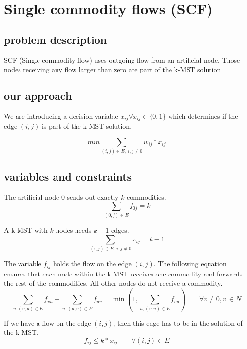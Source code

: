 \section{Single commodity flows (SCF)}

\subsection{problem description}
SCF (Single commodity flow) uses outgoing flow from an artificial node. Those nodes receiving any flow larger than zero are part of the k-MST solution

\subsection{our approach}
We are introducing a decision variable $x_{ij} \forall x_{ij} \in \{0,1\}$ which determines if the edge $(i,j)$ is part of the k-MST solution.

\begin{equation}
  min \sum_{(i,j) \in E, \ i,j \not =  0} w_{ij} * x_{ij} 
\end{equation}

\subsection{variables and constraints}

The artificial node $0$ sends out exactly $k$ commodities.
\begin{equation}
  \sum_{(0,j) \in E} f_{0j} = k 
\end{equation}

A k-MST with $k$ nodes needs $k-1$ edges.
\begin{equation}
  \sum_{(i,j) \in E, \ i,j \not =  0} x_{ij} = k-1 
\end{equation}

The variable $f_{ij}$ holds the flow on the edge $(i,j)$. 
The following equation ensures that each node within the k-MST
receives one commodity and forwards the rest of the commodities. 
All other nodes do not receive a commodity.
\begin{equation}
  \sum_{u, (v,u) \in E} f_{vu} - \sum_{u, (u,v) \in E} f_{uv} = \min (1, \sum_{u, (v,u) \in E} f_{vu}) \qquad  \forall v \not = 0, v \ \in N 
\end{equation}

If we have a flow on the edge $(i,j)$, then this edge has to be
in the solution of the k-MST.
\begin{equation}
  f_{ij} \leq k * x_{ij} \qquad \forall (i,j) \in E 
\end{equation}

